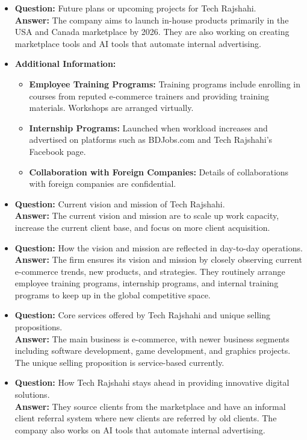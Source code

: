 \documentclass[12pt,a4paper]{article}
\begin{document}
\begin{itemize}
    \item \textbf{Question:} Future plans or upcoming projects for Tech Rajshahi.\\
    \textbf{Answer:} The company aims to launch in-house products primarily in the USA and Canada marketplace by 2026. They are also working on creating marketplace tools and AI tools that automate internal advertising.

    \item \textbf{Additional Information:}
    \begin{itemize}
        \item \textbf{Employee Training Programs:} Training programs include enrolling in courses from reputed e-commerce trainers and providing training materials. Workshops are arranged virtually.
        \item \textbf{Internship Programs:} Launched when workload increases and advertised on platforms such as BDJobs.com and Tech Rajshahi’s Facebook page.
        \item \textbf{Collaboration with Foreign Companies:} Details of collaborations with foreign companies are confidential.
    \end{itemize}

    \item \textbf{Question:} Current vision and mission of Tech Rajshahi.\\
    \textbf{Answer:} The current vision and mission are to scale up work capacity, increase the current client base, and focus on more client acquisition.

    \item \textbf{Question:} How the vision and mission are reflected in day-to-day operations.\\
    \textbf{Answer:} The firm ensures its vision and mission by closely observing current e-commerce trends, new products, and strategies. They routinely arrange employee training programs, internship programs, and internal training programs to keep up in the global competitive space.

    \item \textbf{Question:} Core services offered by Tech Rajshahi and unique selling propositions.\\
    \textbf{Answer:} The main business is e-commerce, with newer business segments including software development, game development, and graphics projects. The unique selling proposition is service-based currently.

    \item \textbf{Question:} How Tech Rajshahi stays ahead in providing innovative digital solutions.\\
    \textbf{Answer:} They source clients from the marketplace and have an informal client referral system where new clients are referred by old clients. The company also works on AI tools that automate internal advertising.


\end{itemize}
\end{document}
